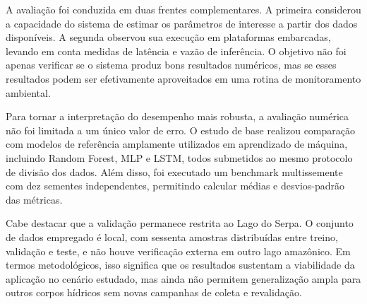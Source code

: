 A avalia\c{c}\~ao foi conduzida em duas frentes complementares. A primeira considerou a capacidade do sistema de estimar os par\^ametros de interesse a partir dos dados dispon\'iveis. A segunda observou sua execu\c{c}\~ao em plataformas embarcadas, levando em conta medidas de lat\^encia e vaz\~ao de infer\^encia. O objetivo n\~ao foi apenas verificar se o sistema produz bons resultados num\'ericos, mas se esses resultados podem ser efetivamente aproveitados em uma rotina de monitoramento ambiental.

Para tornar a interpreta\c{c}\~ao do desempenho mais robusta, a avalia\c{c}\~ao num\'erica n\~ao foi limitada a um \'unico valor de erro. O estudo de base realizou compara\c{c}\~ao com modelos de refer\^encia amplamente utilizados em aprendizado de m\'aquina, incluindo Random Forest, MLP e LSTM, todos submetidos ao mesmo protocolo de divis\~ao dos dados. Al\'em disso, foi executado um benchmark multissemente com dez sementes independentes, permitindo calcular m\'edias e desvios-padr\~ao das m\'etricas.

Cabe destacar que a valida\c{c}\~ao permanece restrita ao Lago do Serpa. O conjunto de dados empregado \'e local, com sessenta amostras distribu\'idas entre treino, valida\c{c}\~ao e teste, e n\~ao houve verifica\c{c}\~ao externa em outro lago amaz\^onico. Em termos metodol\'ogicos, isso significa que os resultados sustentam a viabilidade da aplica\c{c}\~ao no cen\'ario estudado, mas ainda n\~ao permitem generaliza\c{c}\~ao ampla para outros corpos h\'idricos sem novas campanhas de coleta e revalida\c{c}\~ao.